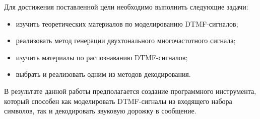 Для достижения поставленной цели необходимо выполнить следующие задачи:

\begin{itemize}
	\item изучить теоретических материалов по моделированию DTMF-сигналов;
	\item реализовать метод генерации двухтонального многочастотного сигнала;
	\item изучить материалы по распознаванию DTMF-сигналов;
	\item выбрать и реализовать одним из методов декодирования.
\end{itemize} 

В результате данной работы предполагается создание программного инструмента, который способен как моделировать DTMF-сигналы из входящего набора символов, так и декодировать звуковую дорожку в сообщение. 

